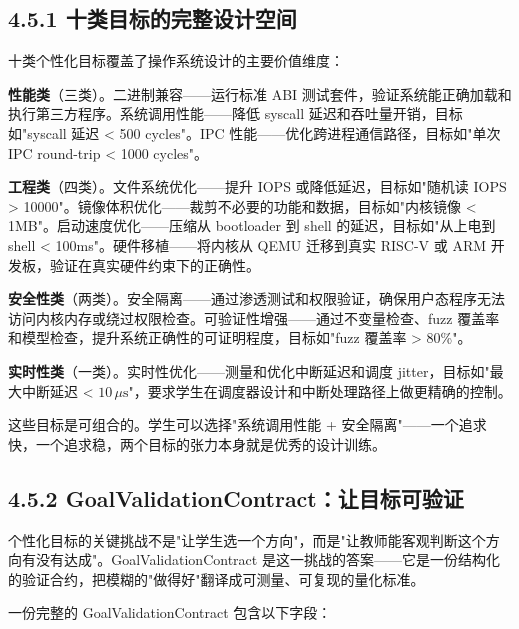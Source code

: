 \documentclass[UTF8,a4paper,12pt,openany]{ctexrep}
\begin{document}
\subsection{4.5.1 十类目标的完整设计空间}\label{451-ux5341ux7c7bux76eeux6807ux7684ux5b8cux6574ux8bbeux8ba1ux7a7aux95f4}

十类个性化目标覆盖了操作系统设计的主要价值维度：

\textbf{性能类}（三类）。二进制兼容------运行标准 ABI 测试套件，验证系统能正确加载和执行第三方程序。系统调用性能------降低 syscall 延迟和吞吐量开销，目标如"syscall 延迟 \textless{} 500 cycles"。IPC 性能------优化跨进程通信路径，目标如"单次 IPC round-trip \textless{} 1000 cycles"。

\textbf{工程类}（四类）。文件系统优化------提升 IOPS 或降低延迟，目标如"随机读 IOPS \textgreater{} 10000"。镜像体积优化------裁剪不必要的功能和数据，目标如"内核镜像 \textless{} 1MB"。启动速度优化------压缩从 bootloader 到 shell 的延迟，目标如"从上电到 shell \textless{} 100ms"。硬件移植------将内核从 QEMU 迁移到真实 RISC-V 或 ARM 开发板，验证在真实硬件约束下的正确性。

\textbf{安全性类}（两类）。安全隔离------通过渗透测试和权限验证，确保用户态程序无法访问内核内存或绕过权限检查。可验证性增强------通过不变量检查、fuzz 覆盖率和模型检查，提升系统正确性的可证明程度，目标如"fuzz 覆盖率 \textgreater{} 80\%"。

\textbf{实时性类}（一类）。实时性优化------测量和优化中断延迟和调度 jitter，目标如"最大中断延迟 \textless{} $10\,\mu\mathrm{s}$"，要求学生在调度器设计和中断处理路径上做更精确的控制。

这些目标是可组合的。学生可以选择"系统调用性能 + 安全隔离"------一个追求快，一个追求稳，两个目标的张力本身就是优秀的设计训练。

\subsection{4.5.2 GoalValidationContract：让目标可验证}\label{452-goalvalidationcontractux8ba9ux76eeux6807ux53efux9a8cux8bc1}

个性化目标的关键挑战不是"让学生选一个方向"，而是"让教师能客观判断这个方向有没有达成"。GoalValidationContract 是这一挑战的答案------它是一份结构化的验证合约，把模糊的"做得好"翻译成可测量、可复现的量化标准。

一份完整的 GoalValidationContract 包含以下字段：
\end{document}
